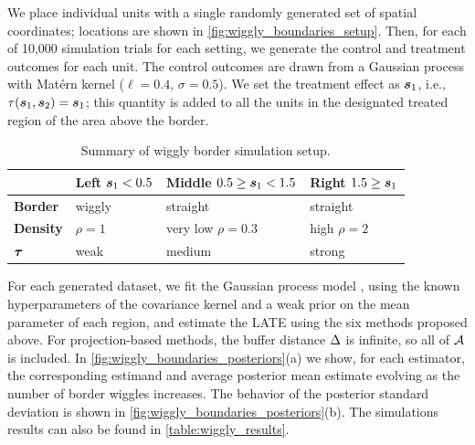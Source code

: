 We place individual units with a single randomly generated set of spatial coordinates; locations are shown in \autoref{fig:wiggly_boundaries_setup}.
Then, for each of 10,000 simulation trials for each setting, we generate the control and treatment outcomes for each unit.
The control outcomes are drawn from a Gaussian process with Mat\'ern kernel (\(\ell=0.4\), \(\sigma=0.5\)).
We set the treatment effect as $\bm{s}_1$, i.e., \(\tau(\bm{s}_1, \bm{s}_2) = \bm{s}_1\); this quantity is added to all the units in the designated treated region of the area above the border.

\begin{table}[tbp]
\centering
\bgroup
\def\arraystretch{1.1}%
\begin{tabular}{llll}
\hline
& Left \(\bm{s}_1< 0.5\) & Middle \(0.5 \ge \bm{s}_1 < 1.5\) & Right \(1.5 \ge \bm{s}_1\)\tabularnewline
\hline
\textbf{Border} & wiggly & straight & straight\tabularnewline
\textbf{Density} & \(\rho=1\) & very low \(\rho=0.3\) & high \(\rho=2\)\tabularnewline
\(\bm{\tau}\) & weak & medium & strong\tabularnewline
\hline
\end{tabular}
\egroup
\caption{
    Summary of wiggly border simulation setup.
    \label{table:wiggly_setup}}
\end{table}

For each generated dataset, we fit the Gaussian process model ,
using the known hyperparameters of the covariance kernel and a weak prior on the mean parameter of each region,
and estimate the LATE using the six methods proposed above.
For projection-based methods, the buffer distance \(\Delta\) is infinite, so all of \(\mathcal{A}\) is included.
In \autoref{fig:wiggly_boundaries_posteriors}(a) we show, for each estimator, the corresponding estimand and average posterior mean estimate evolving as the number of border wiggles increases.
The behavior of the posterior standard deviation is shown in \autoref{fig:wiggly_boundaries_posteriors}(b).
The simulations results can also be found in \autoref{table:wiggly_results}.



